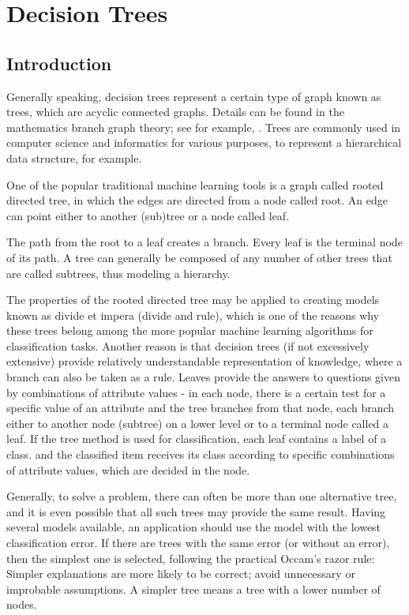 \chapter{Decision Trees}
\section{Introduction}
Generally speaking, decision trees represent a certain type of graph known as trees, which are acyclic connected graphs. Details can be found in the mathematics branch graph theory; see for example, \cite{ref238, ref105}. Trees are commonly used in computer science and informatics for various purposes, to represent a hierarchical data structure, for example.

One of the popular traditional machine learning tools is a graph called rooted directed tree, in which the edges are directed from a node called root. An edge can point either to another (sub)tree or a node called leaf.

The path from the root to a leaf creates a branch. Every leaf is the terminal node of its path. A tree can generally be composed of any number of other trees that are called subtrees, thus modeling a hierarchy.

The properties of the rooted directed tree may be applied to creating models known as divide et impera (divide and rule), which is one of the reasons why these trees belong among the more popular machine learning algorithms for classification tasks. Another reason is that decision trees (if not excessively extensive) provide relatively understandable representation of knowledge, where a branch can also be taken as a rule. Leaves provide the answers to questions given by combinations of attribute values - in each node, there is a certain test for a specific value of an attribute and the tree branches from that node, each branch either to another node (subtree) on a lower level or to a terminal node called a leaf. If the tree method is used for classification, each leaf contains a label of a class. and the classified item receives its class according to specific combinations of attribute values, which are decided in the node.

Generally, to solve a problem, there can often be more than one alternative tree, and it is even possible that all such trees may provide the same result. Having several models available, an application should use the model with the lowest classification error. If there are trees with the same error (or without an error), then the simplest one is selected, following the practical Occam's razor rule: Simpler explanations are more likely to be correct; avoid unnecessary or improbable assumptions. A simpler tree means a tree with a lower number of nodes.


